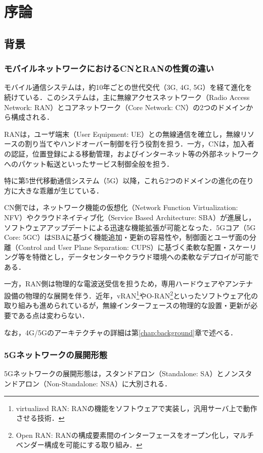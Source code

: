 \chapter{序論}
\label{chap:introduction}

\section{背景}

\subsection{モバイルネットワークにおけるCNとRANの性質の違い}
モバイル通信システムは，約10年ごとの世代交代（3G, 4G, 5G）を経て進化を続けている\cite{ITUR_M2083}．このシステムは，主に無線アクセスネットワーク（Radio Access Network: RAN）とコアネットワーク（Core Network: CN）の2つのドメインから構成される．

RANは，ユーザ端末（User Equipment: UE）との無線通信を確立し，無線リソースの割り当てやハンドオーバー制御を行う役割を担う．一方，CNは，加入者の認証，位置登録による移動管理，およびインターネット等の外部ネットワークへのパケット転送といったサービス制御全般を担う．

特に第5世代移動通信システム（5G）以降，これら2つのドメインの進化の在り方に大きな乖離が生じている．

CN側では，ネットワーク機能の仮想化（Network Function Virtualization: NFV）\cite{ETSI_NFV002}やクラウドネイティブ化（Service Based Architecture: SBA）\cite{3GPP_TS23501_R15}が進展し，ソフトウェアアップデートによる迅速な機能拡張が可能となった．5Gコア（5G Core: 5GC）はSBAに基づく機能追加・更新の容易性や，制御面とユーザ面の分離（Control and User Plane Separation: CUPS）\cite{3GPP_TS23214}に基づく柔軟な配置・スケーリング等を特徴とし，データセンターやクラウド環境への柔軟なデプロイが可能である．

一方，RAN側は物理的な電波送受信を担うため，専用ハードウェアやアンテナ設備の物理的な展開を伴う．近年，vRAN\footnote{virtualized RAN: RANの機能をソフトウェアで実装し，汎用サーバ上で動作させる技術．}やO-RAN\footnote{Open RAN: RANの構成要素間のインターフェースをオープン化し，マルチベンダー構成を可能にする取り組み．}といったソフトウェア化の取り組みも進められているが\cite{ORAN_WhitePaper2018, Garcia_ORAN2021}，無線インターフェースの物理的な設置・更新が必要である点は変わらない．

なお，4G/5Gのアーキテクチャの詳細は第\ref{chap:background}章で述べる．

\subsection{5Gネットワークの展開形態}
5Gネットワークの展開形態は，スタンドアロン（Standalone: SA）とノンスタンドアロン（Non-Standalone: NSA）に大別される\cite{3GPP_5GSystemOverview}．

